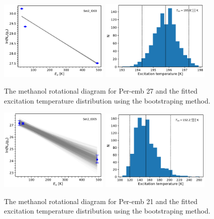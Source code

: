 \documentclass[twocolumn]{aastex62}
\begin{document}
\begin{figure}[htbp!]
  \centering
  \includegraphics[width=0.47\textwidth]{Set2_ID03.pdf}
  \includegraphics[width=0.47\textwidth]{Set2_ID03_rot_temps.pdf}
  \caption{The methanol rotational diagram for Per-emb 27 and the fitted excitation temperature distribution using the bootstraping method.}
  \label{}
\end{figure}

\begin{figure}[htbp!]
  \centering
  \includegraphics[width=0.47\textwidth]{Set2_ID05.pdf}
  \includegraphics[width=0.47\textwidth]{Set2_ID05_rot_temps.pdf}
  \caption{The methanol rotational diagram for Per-emb 21 and the fitted excitation temperature distribution using the bootstraping method.}
  \label{}
\end{figure}
\end{document}

